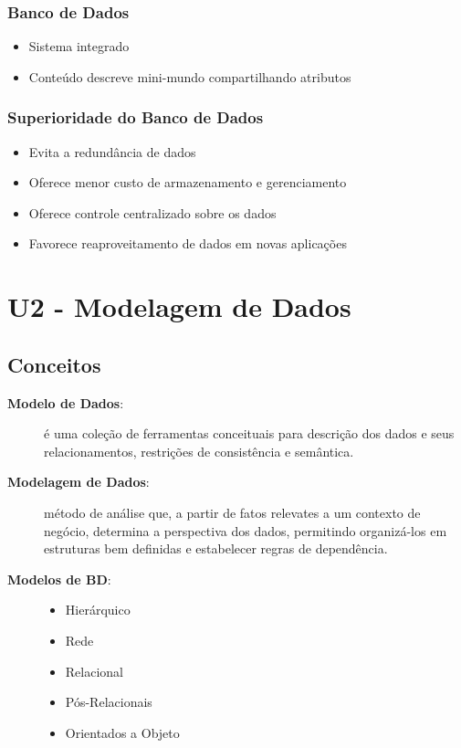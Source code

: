 \documentclass[12pt,a4paper,titlepage]{article}
\begin{document}
\subsubsection{Banco de Dados}
\begin{itemize}
    \item Sistema integrado
    \item Conteúdo descreve mini-mundo compartilhando atributos
\end{itemize}

\subsubsection{Superioridade do Banco de Dados}
\begin{itemize}
    \item Evita a redundância de dados
    \item Oferece menor custo de armazenamento e gerenciamento
    \item Oferece controle centralizado sobre os dados
    \item Favorece reaproveitamento de dados em novas aplicações
\end{itemize}

\section{U2 - Modelagem de Dados}
\subsection{Conceitos}
\begin{description}
    \item[\textbf{Modelo de Dados}:] 
        \sloppy é uma coleção de ferramentas conceituais para descrição dos dados e  
        seus relacionamentos, restrições de consistência e semântica.
    \item[\textbf{Modelagem de Dados}:] método de análise que, a partir de fatos relevates a um contexto de negócio, 
        determina a perspectiva dos dados, permitindo organizá-los em estruturas bem definidas e estabelecer regras de dependência.
    \item[\textbf{Modelos de BD}:]\hfill
        \begin{itemize}
            \item Hierárquico
            \item Rede
            \item Relacional
            \item Pós-Relacionais
            \item Orientados a Objeto
        \end{itemize}
\end{description}
\end{document}
